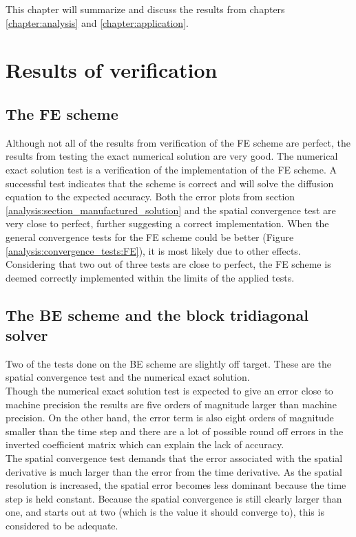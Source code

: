 \noindent This chapter will summarize and discuss the results from chapters \ref{chapter:analysis} and \ref{chapter:application}.

\section{Results of verification}


\subsection{The FE scheme}
Although not all of the results from verification of the FE scheme are perfect, the results from testing the exact numerical solution are very good. 
The numerical exact solution test is a verification of the implementation of the FE scheme. 
A successful test indicates that the scheme is correct and will solve the diffusion equation to the expected accuracy. 
Both the error plots from section \ref{analysis:section_manufactured_solution} and the spatial convergence test are very close to perfect, further suggesting a correct implementation. 
When the general convergence tests for the FE scheme could be better (Figure \ref{analysis:convergence_tests:FE}), it is most likely due to other effects. \\
Considering that two out of three tests are close to perfect, the FE scheme is deemed correctly implemented within the limits of the applied tests.

\subsection{The BE scheme and the block tridiagonal solver}
Two of the tests done on the BE scheme are slightly off target. 
These are the spatial convergence test and the numerical exact solution. \\
Though the numerical exact solution test is expected to give an error close to machine precision the results are five orders of magnitude larger than machine precision. 
On the other hand, the error term is also eight orders of magnitude smaller than the time step and there are a lot of possible round off errors in the inverted coefficient matrix which can explain the lack of accuracy. \\
The spatial convergence test demands that the error associated with the spatial derivative is much larger than the error from the time derivative. 
As the spatial resolution is increased, the spatial error becomes less dominant because the time step is held constant. 
Because the spatial convergence is still clearly larger than one, and starts out at two (which is the value it should converge to), this is considered to be adequate. \\

